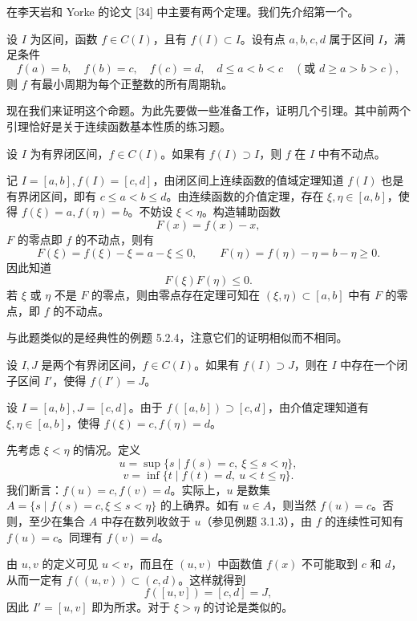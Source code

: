 在李天岩和 Yorke 的论文 [34] 中主要有两个定理。我们先介绍第一个。

\begin{xproposition}
设 $I$ 为区间，函数 $f\in C(I)$，且有 $f(I)\subset I$。设有点 $a,b,c,d$ 属于区间 $I$，满足条件
\[
  f(a)=b,\quad f(b)=c,\quad f(c)=d,\quad d\le a<b<c\quad(\text{或 }d\ge a>b>c),
\]
则 $f$ 有最小周期为每个正整数的所有周期轨。
\end{xproposition}

现在我们来证明这个命题。为此先要做一些准备工作，证明几个引理。其中前两个引理恰好是关于连续函数基本性质的练习题。

\begin{xexample}[5.6.1（引理 1）]
设 $I$ 为有界闭区间，$f\in C(I)$。如果有 $f(I)\supset I$，则 $f$ 在 $I$ 中有不动点。
\end{xexample}
\begin{xproof}
记 $I=[a,b],f(I)=[c,d]$，由闭区间上连续函数的值域定理知道 $f(I)$ 也是有界闭区间，即有 $c\le a<b\le d$。由连续函数的介值定理，存在 $\xi,\eta\in[a,b]$，使得 $f(\xi)=a,f(\eta)=b$。不妨设 $\xi<\eta$。构造辅助函数
\[
  F(x)=f(x)-x,
\]
$F$ 的零点即 $f$ 的不动点，则有
\[
  F(\xi)=f(\xi)-\xi=a-\xi\le0,\qquad F(\eta)=f(\eta)-\eta=b-\eta\ge0.
\]
因此知道
\[
  F(\xi)F(\eta)\le0.
\]
若 $\xi$ 或 $\eta$ 不是 $F$ 的零点，则由零点存在定理可知在 $(\xi,\eta)\subset[a,b]$ 中有 $F$ 的零点，即 $f$ 的不动点。
\end{xproof}

\begin{xremark}
与此题类似的是经典性的例题 5.2.4，注意它们的证明相似而不相同。
\end{xremark}

\begin{xexample}[5.6.2（引理 2）]
设 $I,J$ 是两个有界闭区间，$f\in C(I)$。如果有 $f(I)\supset J$，则在 $I$ 中存在一个闭子区间 $I'$，使得 $f(I')=J$。
\end{xexample}
\begin{xproof}
设 $I=[a,b],J=[c,d]$。由于 $f([a,b])\supset[c,d]$，由介值定理知道有 $\xi,\eta\in[a,b]$，使得 $f(\xi)=c,f(\eta)=d$。

先考虑 $\xi<\eta$ 的情况。定义
\[
  u=\sup\{s\mid f(s)=c,\ \xi\le s<\eta\},
\]
\[
  v=\inf\{t\mid f(t)=d,\ u<t\le\eta\}.
\]
我们断言：$f(u)=c,f(v)=d$。实际上，$u$ 是数集 $A=\{s\mid f(s)=c,\xi\le s<\eta\}$ 的上确界。如有 $u\in A$，则当然 $f(u)=c$。否则，至少在集合 $A$ 中存在数列收敛于 $u$（参见例题 3.1.3），由 $f$ 的连续性可知有 $f(u)=c$。同理有 $f(v)=d$。

由 $u,v$ 的定义可见 $u<v$，而且在 $(u,v)$ 中函数值 $f(x)$ 不可能取到 $c$ 和 $d$，从而一定有 $f((u,v))\subset(c,d)$。这样就得到
\[
  f([u,v])=[c,d]=J,
\]
因此 $I'=[u,v]$ 即为所求。对于 $\xi>\eta$ 的讨论是类似的。
\end{xproof}

